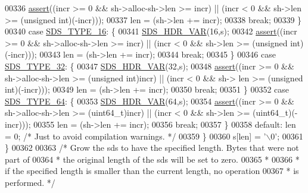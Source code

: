 \begin{DoxyCode}
{00336             \hyperlink{redisassert_8h_a993abaa2c168852c1592879472938781}{assert}((incr >= 0 && sh->alloc-sh->len >= incr) || (incr < 0 && sh->len >= (\textcolor{keywordtype}{unsigned}
       \textcolor{keywordtype}{int})(-incr)));
00337             len = (sh->len += incr);
00338             \textcolor{keywordflow}{break};
00339         \}
00340         \textcolor{keywordflow}{case} \hyperlink{sds_8h_aa54044bf70a30824caeb1bab3615bff2}{SDS\_TYPE\_16}: \{
00341             \hyperlink{sds_8h_a79b76920d1d9bc010926b7af167de89b}{SDS\_HDR\_VAR}(16,s);
00342             \hyperlink{redisassert_8h_a993abaa2c168852c1592879472938781}{assert}((incr >= 0 && sh->alloc-sh->len >= incr) || (incr < 0 && sh->len >= (\textcolor{keywordtype}{unsigned}
       \textcolor{keywordtype}{int})(-incr)));
00343             len = (sh->len += incr);
00344             \textcolor{keywordflow}{break};
00345         \}
00346         \textcolor{keywordflow}{case} \hyperlink{sds_8h_a0ad2103bbdaa2fe5511ce3279cb42293}{SDS\_TYPE\_32}: \{
00347             \hyperlink{sds_8h_a79b76920d1d9bc010926b7af167de89b}{SDS\_HDR\_VAR}(32,s);
00348             \hyperlink{redisassert_8h_a993abaa2c168852c1592879472938781}{assert}((incr >= 0 && sh->alloc-sh->len >= (\textcolor{keywordtype}{unsigned} \textcolor{keywordtype}{int})incr) || (incr < 0 && sh->
      len >= (\textcolor{keywordtype}{unsigned} \textcolor{keywordtype}{int})(-incr)));
00349             len = (sh->len += incr);
00350             \textcolor{keywordflow}{break};
00351         \}
00352         \textcolor{keywordflow}{case} \hyperlink{sds_8h_ad03c6e0fdab3a871e10cce347e8bb4e6}{SDS\_TYPE\_64}: \{
00353             \hyperlink{sds_8h_a79b76920d1d9bc010926b7af167de89b}{SDS\_HDR\_VAR}(64,s);
00354             \hyperlink{redisassert_8h_a993abaa2c168852c1592879472938781}{assert}((incr >= 0 && sh->alloc-sh->len >= (uint64\_t)incr) || (incr < 0 && sh->len >=
       (uint64\_t)(-incr)));
00355             len = (sh->len += incr);
00356             \textcolor{keywordflow}{break};
00357         \}
00358         \textcolor{keywordflow}{default}: len = 0; \textcolor{comment}{/* Just to avoid compilation warnings. */}
00359     \}
00360     s[len] = \textcolor{stringliteral}{'\(\backslash\)0'};
00361 \}
00362 
00363 \textcolor{comment}{/* Grow the sds to have the specified length. Bytes that were not part of}
00364 \textcolor{comment}{ * the original length of the sds will be set to zero.}
00365 \textcolor{comment}{ *}
00366 \textcolor{comment}{ * if the specified length is smaller than the current length, no operation}
00367 \textcolor{comment}{ * is performed. */}
}
\end{DoxyCode}
